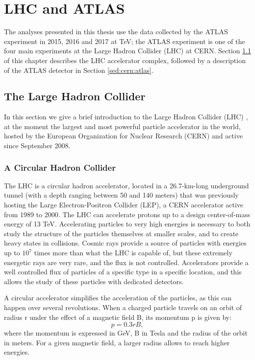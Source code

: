 \chapter{LHC and ATLAS}
\label{chap:cern}

The analyses presented in this thesis use the data collected by the ATLAS experiment in 2015, 2016 and 2017 at \cmtre TeV; the ATLAS experiment is one of the four main experiments at the Large Hadron Collider (LHC) at CERN. Section \ref{sed:cern:lhc} of this chapter describes the LHC accelerator complex, followed by a description of the ATLAS detector in Section \ref{sed:cern:atlas}.


\section{The Large Hadron Collider}
\label{sed:cern:lhc}

In this section we give a brief introduction to the Large Hadron Collider (LHC) \cite{1748-0221-3-08-S08001}, at the moment the largest and most powerful particle accelerator in the world, hosted by the European Organization for Nuclear Research (CERN) and active since September 2008.



\subsection{A Circular Hadron Collider}

The LHC is a circular hadron accelerator, located in a 26.7-km-long underground tunnel (with a depth ranging between 50 and 140 meters) that was previously hosting the Large Electron-Positron Collider (LEP), a CERN accelerator active from 1989 to 2000. The LHC can accelerate protons up to a design center-of-mass energy of 13 TeV. Accelerating particles to very high energies is necessary to both study the structure of the particles themselves at smaller scales, and to create heavy states in collisions. Cosmic rays provide a source of particles with energies up to $10^7$ times more than what the LHC is capable of, but these extremely energetic rays are very rare, and the flux is not controlled. Accelerators provide a well controlled flux of particles of a specific type in a specific location, and this allows the study of these particles with dedicated detectors.

A circular accelerator simplifies the acceleration of the particles, as this can happen over several revolutions. When a charged particle travels on an orbit of radius r under the effect of a magnetic field B, its momentum p is given by:
\begin{equation}
\label{eq:cern:p03br}
p = 0.3 r B,
\end{equation}
\noindent where the momentum is expressed in GeV, B in Tesla and the radius of the orbit in meters. For a given magnetic field, a larger radius allows to reach higher energies. 

